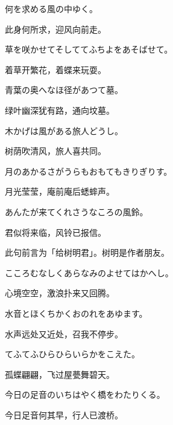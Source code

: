 \begin{haiku}
    {\FH 何を求める風の中ゆく。}

    {\FK 此身何所求，迎风向前走。}
\end{haiku}

\begin{haiku}
    {\FH 草を咲かせてそしててふちよをあそばせて。}

    {\FK 着草开繁花，着蝶来玩耍。}
\end{haiku}

\begin{haiku}
    {\FH 青葉の奥へなほ径があつて墓。}

    {\FK 绿叶幽深犹有路，通向坟墓。}
\end{haiku}

\begin{haiku}
    {\FH 木かげは風がある旅人どうし。}

    {\FK 树荫吹清风，旅人喜共同。}
\end{haiku}

\begin{haiku}
    {\FH 月のあかるさがうらもおもてもきりぎりす。}

    {\FK 月光莹莹，庵前庵后蟋蟀声。}
\end{haiku}

\begin{haiku}
    {\FH あんたが来てくれさうなころの風鈴。}

    {\FK 君似将来临，风铃已报信。}

    {\FS 此句前言为「给树明君」。树明是作者朋友。}
\end{haiku}

\begin{haiku}
    {\FH こころむなしくあらなみのよせてはかへし。}

    {\FK 心境空空，激浪扑来又回腾。}
\end{haiku}

\begin{haiku}
    {\FH 水音とほくちかくおのれをあゆます。}

    {\FK 水声远处又近处，召我不停步。}
\end{haiku}

\begin{haiku}
    {\FH てふてふひらひらいらかをこえた。}

    {\FK 孤蝶翩翩，飞过屋甍舞碧天。}
\end{haiku}

\begin{haiku}
    {\FH 今日の足音のいちはやく橋をわたりくる。}

    {\FK 今日足音何其早，行人已渡桥。}
\end{haiku}

